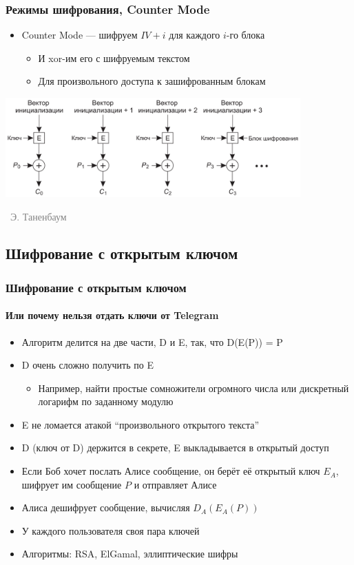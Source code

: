 \documentclass[xetex,mathserif,serif]{beamer}
\newcommand{\attribution}[1] {
\vspace{-5mm}\begin{flushright}\begin{scriptsize}\textcolor{gray}{\textcopyright\, #1}\end{scriptsize}\end{flushright}
}
\begin{document}
	\begin{frame}
		\frametitle{Режимы шифрования, Counter Mode}
		\begin{itemize}
			\item Counter Mode --- шифруем $IV + i$ для каждого $i$-го блока
			\begin{itemize}
				\item И xor-им его с шифруемым текстом
				\item Для произвольного доступа к зашифрованным блокам
			\end{itemize}
		\end{itemize}
		\begin{center}
			\includegraphics[width=0.85\textwidth]{cm.png}
			\attribution{Э. Таненбаум}
		\end{center}
	\end{frame}

	\subsection{Шифрование с открытым ключом}

	\begin{frame}
		\frametitle{Шифрование с открытым ключом}
		\framesubtitle{Или почему нельзя отдать ключи от Telegram}
		\begin{itemize}
			\item Алгоритм делится на две части, D и E, так, что D(E(P)) = P
			\item D очень сложно получить по E
			\begin{itemize}
				\item Например, найти простые сомножители огромного числа или дискретный логарифм по заданному модулю
			\end{itemize}
			\item E не ломается атакой ``произвольного открытого текста''
			\item D (ключ от D) держится в секрете, E выкладывается в открытый доступ
			\item Если Боб хочет послать Алисе сообщение, он берёт её открытый ключ $E_A$, шифрует им сообщение $P$ и отправляет Алисе
			\item Алиса дешифрует сообщение, вычисляя $D_A(E_A(P))$
			\item У каждого пользователя своя пара ключей
			\item Алгоритмы: RSA, ElGamal, эллиптические шифры
		\end{itemize}
	\end{frame}
\end{document}
